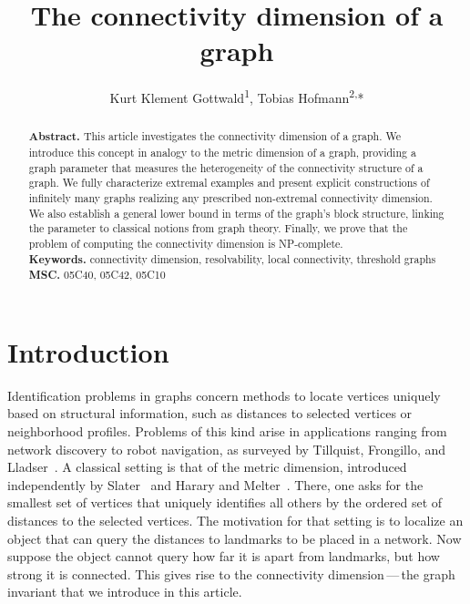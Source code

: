 \documentclass[letterpaper,12pt,headings=normal,parskip=half]{scrartcl}
\title{\Large The connectivity dimension of a graph}
\author{\normalsize Kurt Klement Gottwald\textsuperscript{1}, Tobias Hofmann\textsuperscript{2,}*}
\date{}
\affil{\footnotesize\textsuperscript{1}TU Chemnitz, \textsuperscript{2}TU Berlin\\
*Corresponding Author, \texttt{tobias.hfm@icloud.com}}
\theoremstyle{definition}
\begin{document}
\maketitle

\begin{abstract}
\noindent
\textbf{Abstract.} This article investigates the connectivity dimension of a graph. 
We introduce this concept in analogy to the metric dimension of a graph, providing a graph parameter that measures the heterogeneity of the connectivity structure of a graph. 
We fully characterize extremal examples and present explicit constructions of infinitely many graphs realizing any prescribed non-extremal connectivity dimension.
We also establish a general lower bound in terms of the graph's block structure, linking the parameter to classical notions from graph theory.
Finally, we prove that the problem of computing the connectivity dimension is NP-complete. \\

\noindent
\textbf{Keywords.} connectivity dimension, resolvability, local connectivity, threshold graphs \\

\noindent
\textbf{MSC.} 05C40, 05C42, 05C10

\end{abstract}

\section{Introduction}\label{sec:intro}

Identification problems in graphs concern methods to locate vertices uniquely based on structural information, such as distances to selected vertices or neighborhood profiles. Problems of this kind arise in applications ranging from network discovery to robot navigation, as surveyed by Tillquist, Frongillo, and Lladser~\cite{tillquist2023getting}. A classical setting is that of the metric dimension, introduced independently by Slater~\cite{slater1975leaves} and Harary and Melter~\cite{harary1976metric}. There, one asks for the smallest set of vertices that uniquely identifies all others by the ordered set of distances to the selected vertices. The motivation for that setting is to localize an object that can query the distances to landmarks to be placed in a network. Now suppose the object cannot query how far it is apart from landmarks, but how strong it is connected. This gives rise to the connectivity dimension\,---\,the graph invariant that we introduce in this article.
\end{document}
